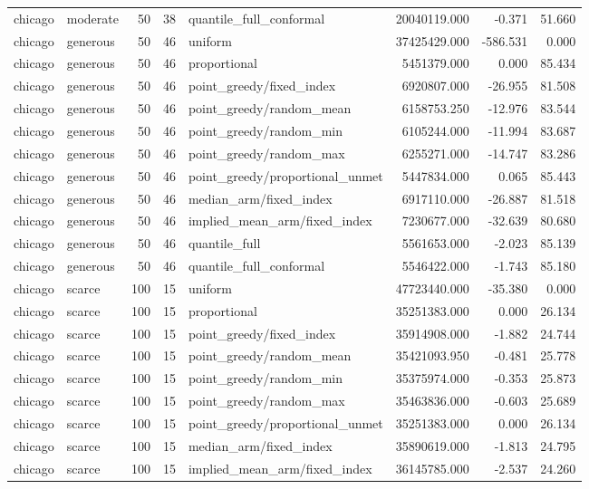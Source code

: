 \begin{tabular}{llrrlrrr}
chicago & moderate & 50 & 38 & quantile\_full\_conformal & 20040119.000 & -0.371 & 51.660 \\
chicago & generous & 50 & 46 & uniform & 37425429.000 & -586.531 & 0.000 \\
chicago & generous & 50 & 46 & proportional & 5451379.000 & 0.000 & 85.434 \\
chicago & generous & 50 & 46 & point\_greedy/fixed\_index & 6920807.000 & -26.955 & 81.508 \\
chicago & generous & 50 & 46 & point\_greedy/random\_mean & 6158753.250 & -12.976 & 83.544 \\
chicago & generous & 50 & 46 & point\_greedy/random\_min & 6105244.000 & -11.994 & 83.687 \\
chicago & generous & 50 & 46 & point\_greedy/random\_max & 6255271.000 & -14.747 & 83.286 \\
chicago & generous & 50 & 46 & point\_greedy/proportional\_unmet & 5447834.000 & 0.065 & 85.443 \\
chicago & generous & 50 & 46 & median\_arm/fixed\_index & 6917110.000 & -26.887 & 81.518 \\
chicago & generous & 50 & 46 & implied\_mean\_arm/fixed\_index & 7230677.000 & -32.639 & 80.680 \\
chicago & generous & 50 & 46 & quantile\_full & 5561653.000 & -2.023 & 85.139 \\
chicago & generous & 50 & 46 & quantile\_full\_conformal & 5546422.000 & -1.743 & 85.180 \\
chicago & scarce & 100 & 15 & uniform & 47723440.000 & -35.380 & 0.000 \\
chicago & scarce & 100 & 15 & proportional & 35251383.000 & 0.000 & 26.134 \\
chicago & scarce & 100 & 15 & point\_greedy/fixed\_index & 35914908.000 & -1.882 & 24.744 \\
chicago & scarce & 100 & 15 & point\_greedy/random\_mean & 35421093.950 & -0.481 & 25.778 \\
chicago & scarce & 100 & 15 & point\_greedy/random\_min & 35375974.000 & -0.353 & 25.873 \\
chicago & scarce & 100 & 15 & point\_greedy/random\_max & 35463836.000 & -0.603 & 25.689 \\
chicago & scarce & 100 & 15 & point\_greedy/proportional\_unmet & 35251383.000 & 0.000 & 26.134 \\
chicago & scarce & 100 & 15 & median\_arm/fixed\_index & 35890619.000 & -1.813 & 24.795 \\
chicago & scarce & 100 & 15 & implied\_mean\_arm/fixed\_index & 36145785.000 & -2.537 & 24.260 \\

\end{tabular}

